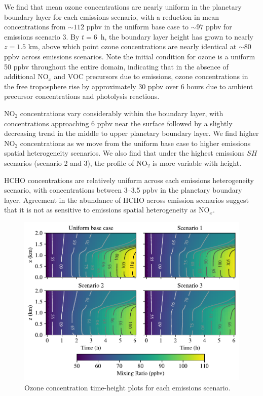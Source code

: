 We find that mean ozone concentrations are nearly uniform in the planetary boundary layer for each emissions scenario, with a reduction in mean concentrations from $\sim 112$ ppbv in the uniform base case to $\sim 97$ ppbv for emissions scenario 3. By $t=6$~h, the boundary layer height has grown to nearly $z=1.5$ \si{km}, above which point ozone concentrations are nearly identical at $\sim80$ \si{ppbv} across emissions scenarios. Note the initial condition for ozone is a uniform 50 \si{ppbv} throughout the entire domain, indicating that in the absence of additional NO$_x$ and VOC precursors due to emissions, ozone concentrations in the free troposphere rise by approximately 30 \si{ppbv} over 6 hours due to ambient precursor concentrations and photolysis reactions.

NO$_2$ concentrations vary considerably within the boundary layer, with concentrations approaching 6 ppbv near the surface followed by a slightly decreasing trend in the middle to upper planetary boundary layer. We find higher NO$_2$ concentrations as we move from the uniform base case to higher emissions spatial heterogeneity scenarios. We also find that under the highest emissions $SH$ scenarios (scenario 2 and 3), the profile of NO$_2$ is more variable with height.

HCHO concentrations are relatively uniform across each emissions heterogeneity scenario, with concentrations between 3--3.5 \si{ppbv} in the planetary boundary layer. Agreement in the abundance of HCHO across emission scenarios suggest that it is not as sensitive to emissions spatial heterogeneity as NO$_x$. 

\begin{figure}[t]
  \centering
    \includegraphics[width=\textwidth]{figures/chapter4/height-time-o3-four-scenarios.pdf}
    \caption{Ozone concentration time-height plots for each emissions scenario.}
    \label{fig:ht-o3}
\end{figure}

